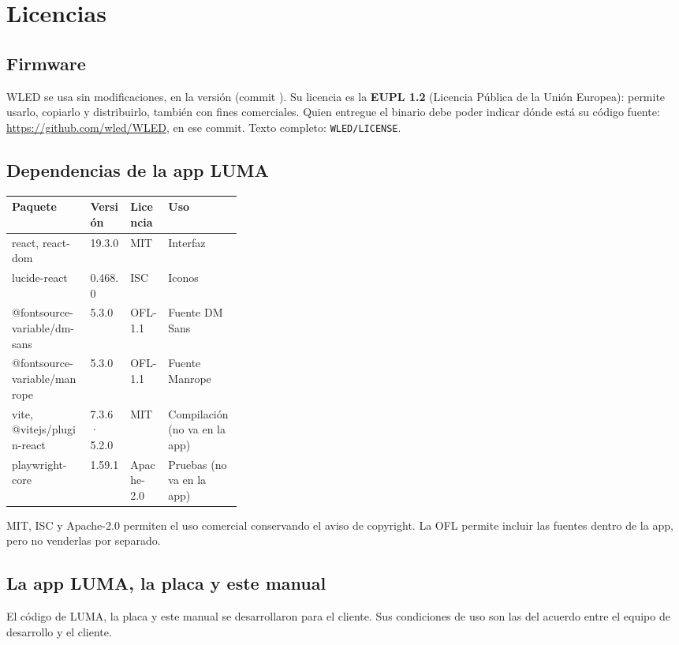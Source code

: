 \chapter{Licencias}\label{anx:licencias}

\section{Firmware}
WLED se usa sin modificaciones, en la versión  (commit \texttt{}). Su licencia es la \textbf{EUPL 1.2} (Licencia Pública de la Unión Europea): permite usarlo, copiarlo y distribuirlo, también con fines comerciales. Quien entregue el binario debe poder indicar dónde está su código fuente: \url{https://github.com/wled/WLED}, en ese commit. Texto completo: \texttt{WLED/LICENSE}.

\section{Dependencias de la app LUMA}

\begin{tabularx}{\linewidth}{@{}>{\raggedright\arraybackslash}p{0.34\linewidth} l l X@{}}
\toprule
\textbf{Paquete} & \textbf{Versión} & \textbf{Licencia} & \textbf{Uso} \\ \midrule
react, react-dom & 19.3.0 & MIT & Interfaz \\
lucide-react & 0.468.0 & ISC & Iconos \\
@fontsource-variable/dm-sans & 5.3.0 & OFL-1.1 & Fuente DM Sans \\
@fontsource-variable/manrope & 5.3.0 & OFL-1.1 & Fuente Manrope \\
vite, @vitejs/plugin-react & 7.3.6 · 5.2.0 & MIT & Compilación (no va en la app) \\
playwright-core & 1.59.1 & Apache-2.0 & Pruebas (no va en la app) \\
\bottomrule
\end{tabularx}

MIT, ISC y Apache-2.0 permiten el uso comercial conservando el aviso de copyright. La OFL permite incluir las fuentes dentro de la app, pero no venderlas por separado.

\section{La app LUMA, la placa y este manual}
El código de LUMA, la placa  y este manual se desarrollaron para el cliente. Sus condiciones de uso son las del acuerdo entre el equipo de desarrollo y el cliente.
